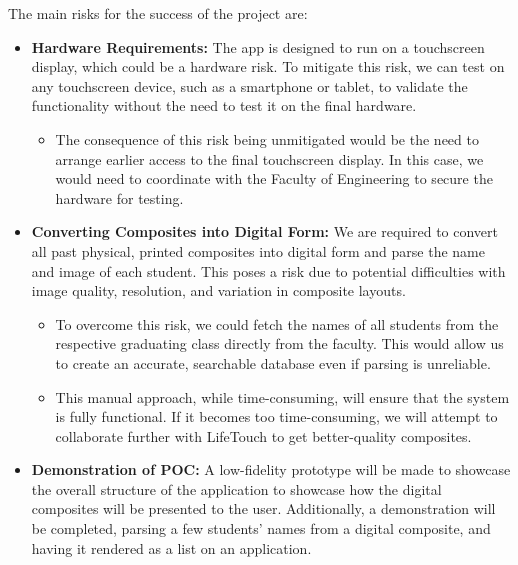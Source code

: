 \documentclass{article}
\begin{document}



The main risks for the success of the project are:

\begin{itemize}
    \item \textbf{Hardware Requirements:}  
    The app is designed to run on a touchscreen display, which could be a hardware risk. To mitigate this risk, we can test on any touchscreen device, such as a smartphone or tablet, to validate the functionality without the need to test it on the final hardware.
    \begin{itemize}
        \item The consequence of this risk being unmitigated would be the need to arrange earlier access to the final touchscreen display. In this case, we would need to coordinate with the Faculty of Engineering to secure the hardware for testing.
    \end{itemize}
    
    \item \textbf{Converting Composites into Digital Form:}  
    We are required to convert all past physical, printed composites into digital form and parse the name and image of each student. This poses a risk due to potential difficulties with image quality, resolution, and variation in composite layouts.
    \begin{itemize}
        \item To overcome this risk, we could fetch the names of all students from the respective graduating class directly from the faculty. This would allow us to create an accurate, searchable database even if parsing is unreliable.
        \item This manual approach, while time-consuming, will ensure that the system is fully functional. If it becomes too time-consuming, we will attempt to collaborate further with LifeTouch to get better-quality composites.
    \end{itemize}
    \item \textbf{Demonstration of POC:}  
    A low-fidelity prototype will be made to showcase the overall structure of the application to showcase how the digital composites will be presented to the user. Additionally, a demonstration will be completed, parsing a few students’ names from a digital composite, and having it rendered as a list on an application.
\end{itemize}
\end{document}
